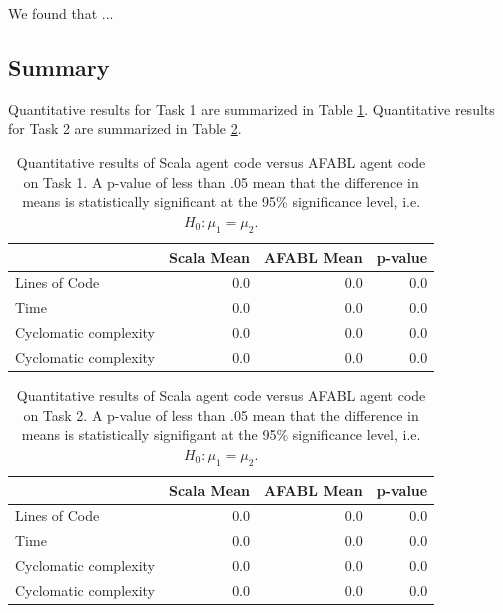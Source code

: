 We found that ...

\subsection{Summary}

Quantitative results for Task 1 are summarized in Table \ref{tbl:task1-results}. Quantitative results for Task 2 are summarized in Table \ref{tbl:task2-results}.

\begin{center}
\begin{table}[h]
\begin{tabular}{|l|r|r|r|}\hline
                      & Scala Mean & AFABL Mean & p-value \\\hline
Lines of Code         & 0.0        & 0.0        & 0.0 \\
Time                  & 0.0        & 0.0        & 0.0 \\
Cyclomatic complexity & 0.0        & 0.0        & 0.0 \\
Cyclomatic complexity & 0.0        & 0.0        & 0.0 \\\hline
\end{tabular}
\caption{Quantitative results of Scala agent code versus AFABL agent code on Task 1. A p-value of less than .05 mean that the difference in means is statistically significant at the 95\% significance level, i.e. $H_0: \mu_1 = \mu_2$.}
\label{tbl:task1-results}
\end{table}
\end{center}

\begin{center}
\begin{table}[h]
\begin{tabular}{|l|r|r|r|}\hline
                      & Scala Mean & AFABL Mean & p-value \\\hline
Lines of Code         & 0.0        & 0.0        & 0.0 \\
Time                  & 0.0        & 0.0        & 0.0 \\
Cyclomatic complexity & 0.0        & 0.0        & 0.0 \\
Cyclomatic complexity & 0.0        & 0.0        & 0.0 \\\hline
\end{tabular}
\caption{Quantitative results of Scala agent code versus AFABL agent code on Task 2. A p-value of less than .05 mean that the difference in means is statistically signifigant at the 95\% significance level, i.e. $H_0: \mu_1 = \mu_2$.}
\label{tbl:task2-results}
\end{table}
\end{center}

